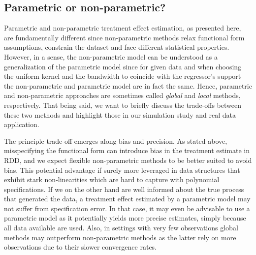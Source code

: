 \subsection{Parametric or non-parametric?} %
\label{sec: para discussion}
Parametric and non-parametric treatment effect estimation, as presented here, are fundamentally different since non-parametric methods relax functional form assumptions, constrain the dataset and face different statistical properties. However, in a sense, the non-parametric model can be understood as a generalization of the parametric model since for given data and when choosing the uniform kernel and the bandwidth to coincide with the regressor's support the non-parametric and parametric model are in fact the same. Hence, parametric and non-parametric approaches are sometimes called \textit{global} and \textit{local} methods, respectively. That being said, we want to briefly discuss the trade-offs between these two methods and highlight those in our simulation study and real data application.

The principle trade-off emerges along bias and precision. As stated above, misspecifying the functional form can introduce bias in the treatment estimate in RDD, and we expect flexible non-parametric methods to be better suited to avoid bias. This potential advantage if surely more leveraged in data structures that exhibit stark non-linearities which are hard to capture with polynomial specifications. If we on the other hand are well informed about the true process that generated the data, a treatment effect estimated by a parametric model may not suffer from specification error. In that case, it may even be advisable to use a parametric model as it potentially yields more precise estimates, simply because all data available are used. Also, in settings with very few observations global methods may outperform non-parametric methods as the latter rely on more observations due to their slower convergence rates.





